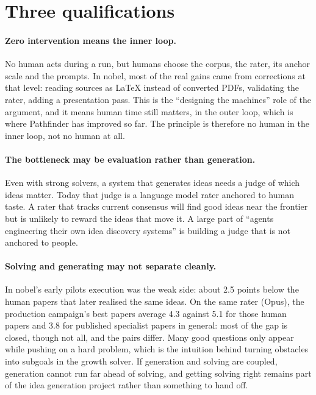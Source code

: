 \documentclass[10pt]{article}
\begin{document}
\section{Three qualifications}

\paragraph{Zero intervention means the inner loop.} No human acts during a run, but humans choose the corpus, the
rater, its anchor scale and the prompts. In nobel, most of the real gains came from corrections at that level:
reading sources as LaTeX instead of converted PDFs, validating the rater, adding a presentation pass. This is the
``designing the machines'' role of the argument, and it means human time still matters, in the outer loop, which is
where Pathfinder has improved so far. The principle is therefore no human in the inner loop, not no human at all.

\paragraph{The bottleneck may be evaluation rather than generation.} Even with strong solvers, a system that
generates ideas needs a judge of which ideas matter. Today that judge is a language model rater anchored to human
taste. A rater that tracks current consensus will find good ideas near the frontier but is unlikely to reward the
ideas that move it. A large part of ``agents engineering their own idea discovery systems'' is building a judge
that is not anchored to people.

\paragraph{Solving and generating may not separate cleanly.} In nobel's early pilots execution was the
weak side: about 2.5 points below the human papers that later realised the same ideas. On the same rater (Opus), the
production campaign's best papers average 4.3 against 5.1 for those human papers and 3.8 for published specialist
papers in general: most of the gap is closed, though not all, and the pairs differ. Many good questions only
appear while pushing on a hard problem, which is the intuition behind turning obstacles into subgoals in the growth
solver. If generation and solving are coupled, generation cannot run far ahead of solving, and getting solving right
remains part of the idea generation project rather than something to hand off.
\end{document}
